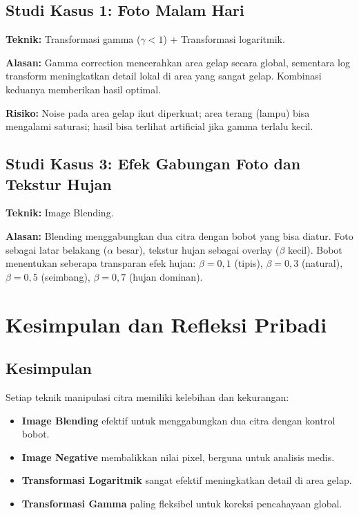 \documentclass[12pt,a4paper]{article}
\begin{document}
\subsection{Studi Kasus 1: Foto Malam Hari}

\textbf{Teknik:} Transformasi gamma ($\gamma < 1$) + Transformasi logaritmik.

\textbf{Alasan:} Gamma correction mencerahkan area gelap secara global, sementara log transform
meningkatkan detail lokal di area yang sangat gelap. Kombinasi keduanya memberikan hasil optimal.

\textbf{Risiko:} Noise pada area gelap ikut diperkuat; area terang (lampu) bisa mengalami saturasi;
hasil bisa terlihat artificial jika gamma terlalu kecil.

\subsection{Studi Kasus 3: Efek Gabungan Foto dan Tekstur Hujan}

\textbf{Teknik:} Image Blending.

\textbf{Alasan:} Blending menggabungkan dua citra dengan bobot yang bisa diatur. Foto sebagai
latar belakang ($\alpha$ besar), tekstur hujan sebagai overlay ($\beta$ kecil). Bobot menentukan
seberapa transparan efek hujan: $\beta = 0,1$ (tipis), $\beta = 0,3$ (natural), $\beta = 0,5$
(seimbang), $\beta = 0,7$ (hujan dominan).

\section{Kesimpulan dan Refleksi Pribadi}

\subsection{Kesimpulan}

Setiap teknik manipulasi citra memiliki kelebihan dan kekurangan:
\begin{itemize}
\item \textbf{Image Blending} efektif untuk menggabungkan dua citra dengan kontrol bobot.
\item \textbf{Image Negative} membalikkan nilai pixel, berguna untuk analisis medis.
\item \textbf{Transformasi Logaritmik} sangat efektif meningkatkan detail di area gelap.
\item \textbf{Transformasi Gamma} paling fleksibel untuk koreksi pencahayaan global.
\end{itemize}
\end{document}
